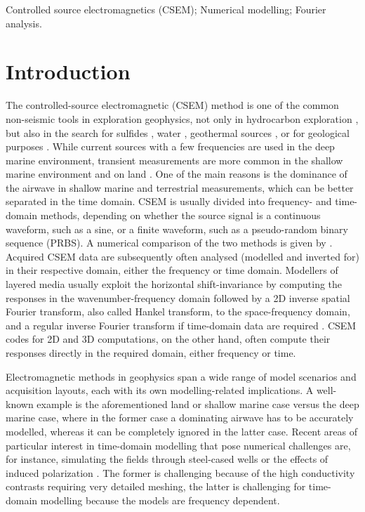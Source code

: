 \documentclass[extra, camera,%
]{gji}
\begin{document}
\begin{keywords}
  Controlled source electromagnetics (CSEM); Numerical modelling; Fourier
  analysis.
\end{keywords}

\section{Introduction}  %

The controlled-source electromagnetic (CSEM) method is one of the common
non-seismic tools in exploration geophysics, not only in hydrocarbon
exploration \citep{GEO.10.Constable}, but also in the search for sulfides
\citep{GRL.19.Gehrmann}, water \citep{GEO.05.Pedersen}, geothermal sources
\citep{WGC.15.Girard}, or for geological purposes \citep{NAT.19.Johanson}.
While current sources with a few frequencies are used in the deep marine
environment, transient measurements are more common in the shallow marine
environment and on land \citep[e.g., ][]{GEO.07.Ziolkowski, SEG.07.Andreis,
SEG.07.Avdeeva}. One of the main reasons is the dominance of the airwave in
shallow marine and terrestrial measurements, which can be better separated in
the time domain. CSEM is usually divided into frequency- and time-domain
methods, depending on whether the source signal is a continuous waveform, such
as a sine, or a finite waveform, such as a pseudo-random binary sequence
(PRBS). A numerical comparison of the two methods is given by
\cite{GP.13.Conell}. Acquired CSEM data are subsequently often analysed
(modelled and inverted for) in their respective domain, either the frequency or
time domain. Modellers of layered media usually exploit the horizontal
shift-invariance by computing the responses in the wavenumber-frequency domain
followed by a 2D inverse spatial Fourier transform, also called Hankel
transform, to the space-frequency domain, and a regular inverse Fourier
transform if time-domain data are required \citep[e.g., ][]{GEO.15.Hunziker}.
CSEM codes for 2D and 3D computations, on the other hand, often compute their
responses directly in the required domain, either frequency or time.

Electromagnetic methods in geophysics span a wide range of model scenarios and
acquisition layouts, each with its own modelling-related implications. A
well-known example is the aforementioned land or shallow marine case versus the
deep marine case, where in the former case a dominating airwave has to be
accurately modelled, whereas it can be completely ignored in the latter case.
Recent areas of particular interest in time-domain modelling that pose
numerical challenges are, for instance, simulating the fields through
steel-cased wells \citep{CAG.19.Heagy} or the effects of induced polarization
\citep{EXP.20.Kang}. The former is challenging because of the high conductivity
contrasts requiring very detailed meshing, the latter is challenging for
time-domain modelling because the models are frequency dependent.
\end{document}
